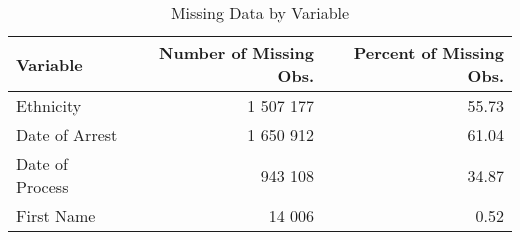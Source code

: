 \begin{table}[t]

\caption{\label{tab:missing_data_count}Missing Data by Variable}
\centering
\begin{tabular}{lrr}
\toprule
Variable & Number of Missing Obs. & Percent of Missing Obs.\\
\midrule
Ethnicity & 1 507 177 & 55.73\\
Date of Arrest & 1 650 912 & 61.04\\
Date of Process & 943 108 & 34.87\\
First Name & 14 006 & 0.52\\
\bottomrule
\end{tabular}
\end{table}